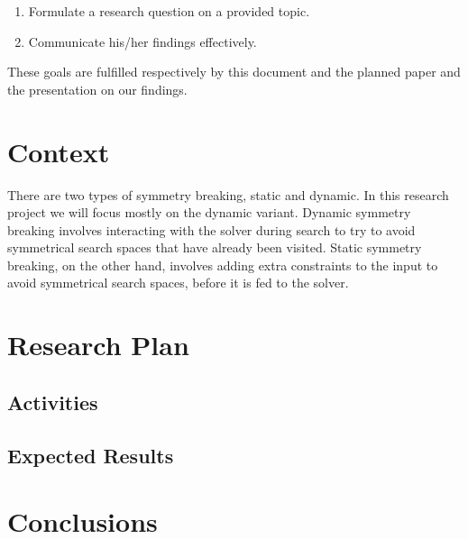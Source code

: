 			\begin{enumerate}
				\item Formulate a research question on a provided topic.
				\item Communicate his/her findings effectively.
			\end{enumerate}

			These goals are fulfilled respectively by this document and the planned paper and the	presentation on our findings.

	\section{Context}
	There are two types of symmetry breaking, static and dynamic. In this research project we will focus mostly on the dynamic variant. Dynamic symmetry breaking involves interacting with the solver during search to try to avoid symmetrical search spaces that have already been visited. Static symmetry breaking, on the other hand, involves adding extra constraints to the input to avoid symmetrical search spaces, before it is fed to the solver.

	\section{Research Plan}

		\subsection{Activities}

		\subsection{Expected Results}

	\section{Conclusions}



